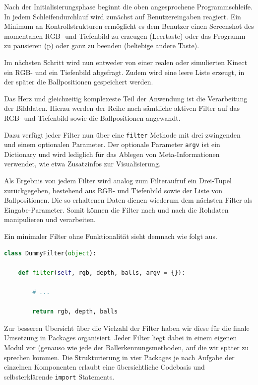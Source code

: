 \documentclass[12pt,a4paper,ngerman]{scrartcl}
\begin{document}
Nach der Initialisierungsphase beginnt die oben angesprochene Programmschleife.
In jedem Schleifendurchlauf wird zunächst auf Benutzereingaben reagiert.
Ein Minimum an Kontrollstrukturen ermöglicht es dem Benutzer einen Screenshot des momentanen RGB- und Tiefenbild zu erzeugen (Leertaste) oder das Programm zu pausieren (p) oder ganz zu beenden (beliebige andere Taste).

Im nächsten Schritt wird nun entweder von einer realen oder simulierten Kinect ein RGB- und ein Tiefenbild abgefragt. Zudem wird eine leere Liste erzeugt, in der später die Ballpositionen gespeichert werden.

Das Herz und gleichzeitig komplexeste Teil der Anwendung ist die Verarbeitung der Bilddaten.
Hierzu werden der Reihe nach sämtliche aktiven Filter auf das RGB- und Tiefenbild sowie die Ballpositionen angewandt.

Dazu verfügt jeder Filter nun über eine \lstinline{filter} Methode mit drei zwingenden und einem optionalen
Parameter. Der optionale Parameter \lstinline{argv} ist ein Dictionary und wird lediglich für das Ablegen von
Meta-Informationen verwendet, wie etwa Zusatzinfos zur Visualisierung.

Als Ergebnis von jedem Filter wird analog zum Filteraufruf ein Drei-Tupel zurückgegeben, bestehend aus RGB- und Tiefenbild sowie der Liste von Ballpositionen. Die so erhaltenen Daten dienen wiederum dem nächsten Filter als Eingabe-Parameter. Somit können die Filter nach und nach die Rohdaten manipulieren und verarbeiten.

Ein minimaler Filter ohne Funktionalität sieht demnach wie folgt aus.

\begin{lstlisting}[language=Python,caption={Grundstruktur eines Filters. In diesem Beispiel werden die Eingabedaten unverändert zurückgegeben.}]
class DummyFilter(object):

    def filter(self, rgb, depth, balls, argv = {}):

        # ...

        return rgb, depth, balls
\end{lstlisting}

Zur besseren Übersicht über die Vielzahl der Filter haben wir diese für die finale Umsetzung in Packages organisiert. Jeder Filter liegt dabei in einem eigenen Modul vor (genauso wie jede der Ballerkennungsmethoden, auf die wir später zu sprechen kommen. Die Strukturierung in vier Packages je nach Aufgabe der einzelnen Komponenten erlaubt eine übersichtliche Codebasis und selbsterklärende \lstinline{import} Statements.
\end{document}

